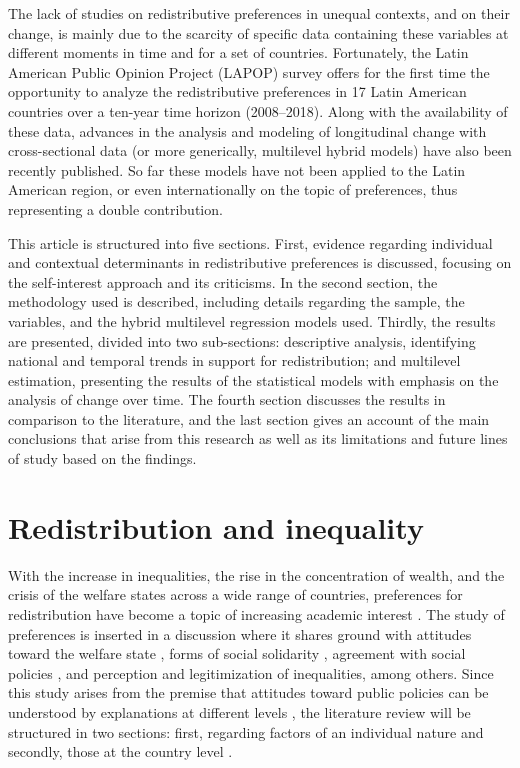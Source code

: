\documentclass[utf8]{frontiersSCNS} %
\begin{document}
The lack of studies on redistributive preferences in unequal contexts, and on their change, is mainly due to the scarcity of specific data containing these variables at different moments in time and for a set of countries. Fortunately, the Latin American Public Opinion Project (LAPOP) survey offers for the first time the opportunity to analyze the redistributive preferences in 17 Latin American countries over a ten-year time horizon (2008–2018). Along with the availability of these data, advances in the analysis and modeling of longitudinal change with cross-sectional data \parencite{Schmidt-Catranrandomeffectsmultilevel2016} (or more generically, multilevel hybrid models) have also been recently published. So far these models have not been applied to the Latin American region, or even internationally on the topic of preferences, thus representing a double contribution.

This article is structured into five sections. First, evidence regarding individual and contextual determinants in redistributive preferences is discussed, focusing on the self-interest approach and its criticisms. In the second section, the methodology used is described, including details regarding the sample, the variables, and the hybrid multilevel regression models used. Thirdly, the results are presented, divided into two sub-sections: descriptive analysis, identifying national and temporal trends in support for redistribution; and multilevel estimation, presenting the results of the statistical models with emphasis on the analysis of change over time. The fourth section discusses the results in comparison to the literature, and the last section gives an account of the main conclusions that arise from this research as well as its limitations and future lines of study based on the findings.

\section{Redistribution and inequality}

With the increase in inequalities, the rise in the concentration of wealth, and the crisis of the welfare states across a wide range of countries, preferences for redistribution have become a topic of increasing academic interest \parencite{rueda_stegmueller_2019}. The study of preferences is inserted in a discussion where it shares ground with attitudes toward the welfare state \parencite{Eger2017, Roosma2014, Reeskens2012}, forms of social solidarity \parencite{Janmaat2009}, agreement with social policies \parencite{Kwon2016}, and perception and legitimization of inequalities, among others. Since this study arises from the premise that attitudes toward public policies can be understood by explanations at different levels \parencite{AlesinaPreferencesRedistribution2009}, the literature review will be structured in two sections: first, regarding factors of an individual nature \parencite{AlesinaPreferencesRedistribution2009, FrankoInequalitySelfInterestPublic2013, McCallUndeservingRichAmerican2013} and secondly, those at the country level \parencite{EdlundTrustgovernmentwelfare1999, IsakssonPreferencesredistributioncountry2009, KenworthyInequalitypublicopinion2007}.
\end{document}
